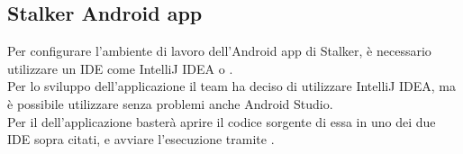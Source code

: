 \documentclass[../manuale-sviluppatore.tex]{subfiles}
\begin{document}
\subsection{Stalker Android app}

Per configurare l'ambiente di lavoro dell'Android app di Stalker, è necessario utilizzare un IDE come IntelliJ IDEA o .\\
Per lo sviluppo dell'applicazione il team ha deciso di utilizzare IntelliJ IDEA, ma è possibile utilizzare senza problemi anche Android Studio.\\
Per il  dell'applicazione basterà aprire il codice sorgente di essa in uno dei due IDE sopra citati, e avviare l'esecuzione tramite . \\
\end{document}
